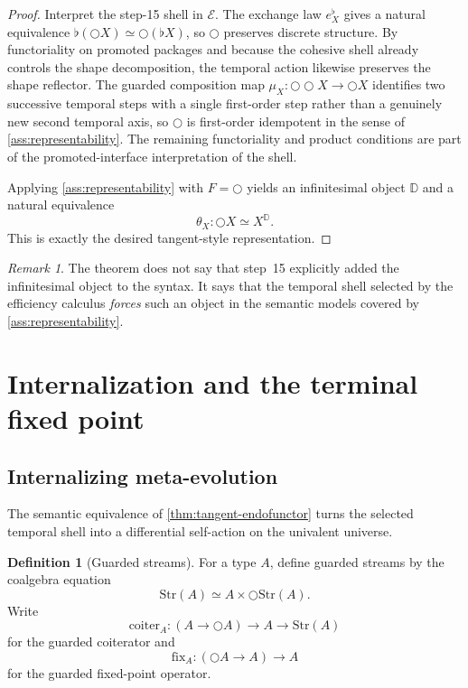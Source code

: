 \documentclass[11pt]{article}
\theoremstyle{plain}
\theoremstyle{definition}
\newtheorem{definition}[theorem]{Definition}
\theoremstyle{remark}
\newtheorem{remark}[theorem]{Remark}
\newcommand{\D}{\mathbb{D}}
\newcommand{\Str}{\mathrm{Str}}
\newcommand{\coiter}{\mathrm{coiter}}
\newcommand{\fix}{\mathrm{fix}}
\begin{document}
\begin{proof}
Interpret the step-15 shell in $\mathcal E$. The exchange law $e^\flat_X$ gives a natural equivalence $\flat(\bigcirc X)\simeq\bigcirc(\flat X)$, so $\bigcirc$ preserves discrete structure. By functoriality on promoted packages and because the cohesive shell already controls the shape decomposition, the temporal action likewise preserves the shape reflector. The guarded composition map $\mu_X:\bigcirc\bigcirc X\to\bigcirc X$ identifies two successive temporal steps with a single first-order step rather than a genuinely new second temporal axis, so $\bigcirc$ is first-order idempotent in the sense of \cref{ass:representability}. The remaining functoriality and product conditions are part of the promoted-interface interpretation of the shell.

Applying \cref{ass:representability} with $F=\bigcirc$ yields an infinitesimal object $\D$ and a natural equivalence
\[
  \theta_X:\bigcirc X\simeq X^\D.
\]
This is exactly the desired tangent-style representation.
\end{proof}

\begin{remark}
The theorem does not say that step~15 explicitly added the infinitesimal object to the syntax. It says that the temporal shell selected by the efficiency calculus \emph{forces} such an object in the semantic models covered by \cref{ass:representability}.
\end{remark}

\section{Internalization and the terminal fixed point}

\subsection{Internalizing meta-evolution}

The semantic equivalence of \cref{thm:tangent-endofunctor} turns the selected temporal shell into a differential self-action on the univalent universe.

\begin{definition}[Guarded streams]
\label{def:streams}
For a type $A$, define guarded streams by the coalgebra equation
\[
  \Str(A)\simeq A\times\bigcirc\Str(A).
\]
Write
\[
  \coiter_A:(A\to\bigcirc A)\to A\to\Str(A)
\]
for the guarded coiterator and
\[
  \fix_A:(\bigcirc A\to A)\to A
\]
for the guarded fixed-point operator.
\end{definition}
\end{document}
